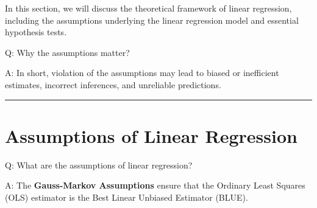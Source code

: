 \documentclass[
  12pt,
  letterpaper,
]{scrbook}
\theoremstyle{definition}
\theoremstyle{plain}
\theoremstyle{remark}
\begin{document}
In this section, we will discuss the theoretical framework of linear
regression, including the assumptions underlying the linear regression
model and essential hypothesis tests.

Q: Why the assumptions matter?

A: In short, violation of the assumptions may lead to biased or
inefficient estimates, incorrect inferences, and unreliable predictions.

\begin{center}\rule{0.5\linewidth}{0.5pt}\end{center}

\section{Assumptions of Linear
Regression}\label{assumptions-of-linear-regression}

Q: What are the assumptions of linear regression?

A: The \textbf{Gauss-Markov Assumptions} ensure that the Ordinary Least
Squares (OLS) estimator is the Best Linear Unbiased Estimator (BLUE).
\end{document}
